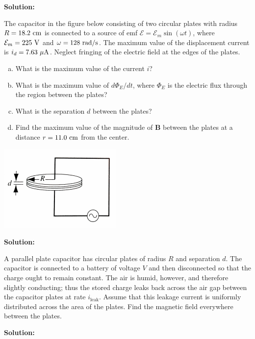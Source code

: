 \documentclass[11pt]{article}
\newcommand{\be}{\begin{enumerate}[a) ]}
\newcommand{\ee}{\end{enumerate}}
\begin{document}
\textbf{Solution:}\\

\clearpage

\begin{problem}[\P(P38.3)]
The capacitor in the figure below consisting of two circular plates with radius $R = 18.2~\mathrm{cm}$ is connected
to a source of emf  $\mathcal{E} = \mathcal{E}_m \sin(\omega t)$, where $\mathcal{E}_m = 225~\mathrm{V}$ and $\omega = 128~\mathrm{rad/s}$. The maximum value of
the displacement current is $i_d = 7.63~\mathrm{\mu A}$. Neglect fringing of the electric field at the edges of the
plates.
\be
\item What is the maximum value of the current $i$?
\item What is the maximum value of $d\Phi_E/dt$, where $\Phi_E$ is the electric flux through the region
between the plates?
\item What is the separation $d$ between the plates?
\item Find the maximum value of the magnitude of \textbf{B} between the plates at a distance $r = 11.0~\mathrm{cm}$
from the center.
\ee
\begin{center}
\includegraphics[scale=0.6]{prob5.png}
\end{center}
\end{problem}


\textbf{Solution:}\\

\clearpage

\begin{problem}
A parallel plate capacitor has circular plates of radius $R$ and separation $d$. The capacitor is
connected to a battery of voltage $V$ and then disconnected so that the charge ought to remain
constant. The air is humid, however, and therefore slightly conducting; thus the stored charge
leaks back across the air gap between the capacitor plates at rate $i_{\text{leak}}$. Assume that this leakage
current is uniformly distributed across the area of the plates. Find the magnetic field everywhere
between the plates.
\end{problem}


\textbf{Solution:}\\

\clearpage
\end{document}
